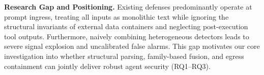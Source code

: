 \documentclass[runningheads]{llncs}
\begin{document}
\noindent\textbf{Research Gap and Positioning.} Existing defenses predominantly operate at prompt ingress, treating all inputs as monolithic text while ignoring the structural invariants of external data containers and neglecting post-execution tool outputs. Furthermore, naively combining heterogeneous detectors leads to severe signal explosion and uncalibrated false alarms. This gap motivates our core investigation into whether structural parsing, family-based fusion, and egress containment can jointly deliver robust agent security (RQ1--RQ3).

\begin{table}[t]
\centering
\caption{Architectural Comparison of Agent Security Defenses}
\label{tab:arch_comparison}
\end{table}

\end{document}
